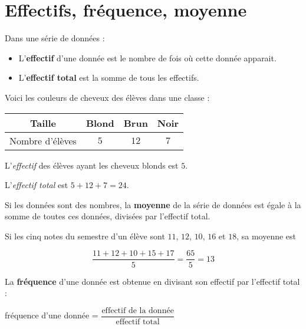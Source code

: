 \documentclass[../€Cours-complet/Cours-complet]{subfiles}
\begin{document}
\maketitleCours

\section{Effectifs, fréquence, moyenne}

\begin{cours}[Effectif]
	Dans une série de données :
	\begin{itemize}
		\item L'\textbf{effectif} d'une donnée est le nombre de fois où cette donnée apparait.
		\item L'\textbf{effectif total} est la somme de tous les effectifs.
	\end{itemize}
\end{cours}

\begin{exemple}
	Voici les couleurs de cheveux des élèves dans une classe :

	\begin{center}
		\begin{tabular}{|c|c|c|c|}
			\hline
			Taille          & Blond & Brun & Noir
			\\ \hline
			Nombre d'élèves & $5$   & $12$ & $7$
			\\ \hline
		\end{tabular}
	\end{center}

	L'\textit{effectif} des élèves ayant les cheveux blonds est $5$.

	L'\textit{effectif total} est $5 + 12 + 7 = 24$.
\end{exemple}

\begin{cours}[Moyenne]
	Si les données sont des nombres, la \textbf{moyenne} de la série de données est égale à la somme de toutes ces données, divisées par l'effectif total.
\end{cours}

\begin{exemple}
	Si les cinq notes du semestre d'un élève sont $11$, $12$, $10$, $16$ et $18$, sa moyenne est

	$$ \dfrac{11 + 12 + 10 + 15 + 17}{5} = \dfrac{65}{5} = 13 $$
\end{exemple}

\begin{cours}[Fréquence]
	La \textbf{fréquence} d'une donnée est obtenue en divisant son effectif par l'effectif total :
	\begin{center}
		fréquence d'une donnée = $\dfrac{\text{effectif de la donnée}}{\text{effectif total}}$
	\end{center}
\end{cours}
\end{document}
